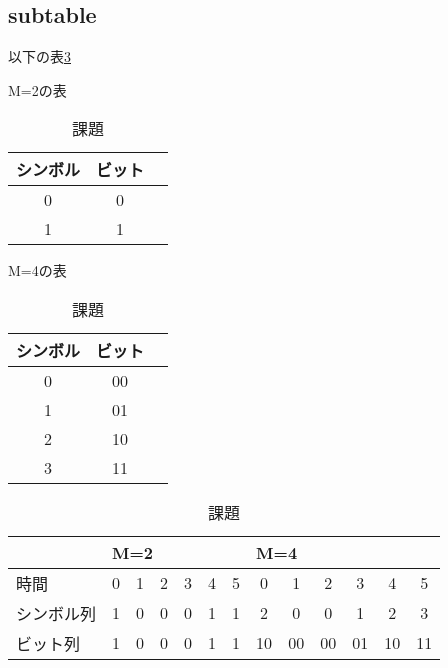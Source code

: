 \documentclass{jsarticle}	       %
\begin{document}
		\subsection{subtable}
			以下の表\ref{課題1.2: 課題}
			\begin{table}[H]
				\begin{subtable}{0.49\columnwidth}
					\begin{center}
						\caption[M=2]{M=2の表}
						\label{課題1.2: M=2の表}
						\setlength{\tabcolsep}{3pt}
						\footnotesize
						\begin{tabular}{|c|c|c}
							\hline
							シンボル & ビット \\ \hline \hline
							0 & 0 \\ \hline
							1 & 1 \\ \hline
						\end{tabular}
					\end{center}
				\end{subtable}
				\begin{subtable}{0.49\columnwidth}
					\begin{center}
						\caption[M=4]{M=4の表}
						\label{課題1.2: M=4の表}
						\setlength{\tabcolsep}{3pt}
						\footnotesize
						\begin{tabular}{|c|c|c}
							\hline
							シンボル & ビット \\ \hline \hline
							0 & 00 \\ \hline
							1 & 01 \\ \hline
							2 & 10 \\ \hline
							3 & 11 \\ \hline
						\end{tabular}
					\end{center}
				\end{subtable}
				\begin{subtable}{\columnwidth}
					\begin{center}
						\caption[M]{課題}
						\label{課題1.2: 課題}
						\setlength{\tabcolsep}{3pt}
						\footnotesize
						\begin{tabular}{|l|c|c|c|c|c|c|c|c|c|c|c|c|}
							\hline
							
								& \multicolumn{6}{|l|}{M=2}
								& \multicolumn{6}{|l|}{M=4} \\ \hline
							時間 
								& 0 & 1 & 2 & 3 & 4 & 5
								& 0 & 1 & 2 & 3 & 4 & 5 \\ \hline
							シンボル列
								& 1 & 0 & 0 & 0 & 1 & 1
								& 2 & 0 & 0 & 1 & 2 & 3 \\ \hline
							ビット列
								&  1 &  0 &  0 &  0 &  1 &  1
								& 10 & 00 & 00 & 01 & 10 & 11 \\ \hline
						\end{tabular}
					\end{center}
				\end{subtable}
			\end{table}
			
\end{document}
